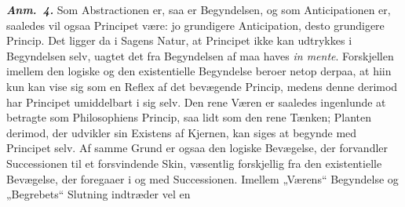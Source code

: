 \documentclass[12pt]{book}
\newcommand{\anm}[1]{\emph{\textbf{Anm.~#1.}}}
\newcommand{\opage}[1]{\marginnote{\footnotesize\textit{[#1]}}}
\begin{document}
\anm{4} Som Abstractionen er, saa er Begyndelsen, og som Anticipationen er, saaledes vil ogsaa
Principet være: jo grundigere Anticipation, desto grundigere Princip. Det ligger da i Sagens
Natur, at Principet ikke kan udtrykkes i Begyndelsen selv, uagtet det fra Begyndelsen af maa
haves \textit{in mente}. Forskjellen imellem den logiske og den existentielle Begyndelse beroer
netop derpaa, at hiin kun kan vise sig som en Reflex af det bevægende Princip, medens denne
derimod har Principet umiddelbart i sig selv. Den rene Væren er saaledes ingenlunde at betragte
som Philosophiens Princip, saa lidt som den rene Tænken; Planten derimod, der udvikler sin
Existens af Kjernen, kan siges at begynde med Principet selv. Af samme Grund er ogsaa den
logiske Bevægelse, der forvandler Successionen til et forsvindende Skin, væsentlig forskjellig
fra den existentielle Bevægelse, der foregaaer i og med Successionen. Imellem „Værens“
Begyndelse og „Begrebets“ Slutning indtræder vel en
\opage{107} %
\end{document}
